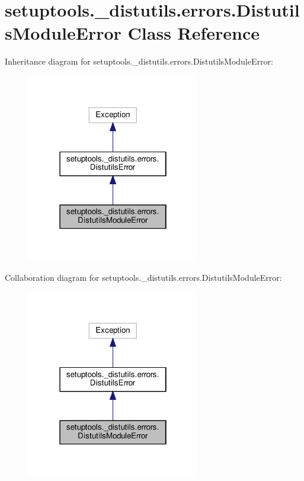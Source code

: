 \hypertarget{classsetuptools_1_1__distutils_1_1errors_1_1DistutilsModuleError}{}\section{setuptools.\+\_\+distutils.\+errors.\+Distutils\+Module\+Error Class Reference}
\label{classsetuptools_1_1__distutils_1_1errors_1_1DistutilsModuleError}


Inheritance diagram for setuptools.\+\_\+distutils.\+errors.\+Distutils\+Module\+Error\+:
\nopagebreak
\begin{figure}[H]
\begin{center}
\leavevmode
\includegraphics[width=214pt]{classsetuptools_1_1__distutils_1_1errors_1_1DistutilsModuleError__inherit__graph}
\end{center}
\end{figure}


Collaboration diagram for setuptools.\+\_\+distutils.\+errors.\+Distutils\+Module\+Error\+:
\nopagebreak
\begin{figure}[H]
\begin{center}
\leavevmode
\includegraphics[width=214pt]{classsetuptools_1_1__distutils_1_1errors_1_1DistutilsModuleError__coll__graph}
\end{center}
\end{figure}


